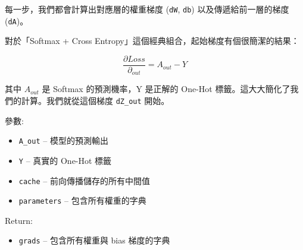 \documentclass[11pt]{article}
\providecommand{\tightlist}{%
      \setlength{\itemsep}{0pt}\setlength{\parskip}{0pt}}
\begin{document}
每一步，我們都會計算出對應層的權重梯度 (\texttt{dW}, \texttt{db})
以及傳遞給前一層的梯度 (\texttt{dA})。

對於「Softmax + Cross Entropy」這個經典組合，起始梯度有個很簡潔的結果：

\[
\frac{∂Loss}{\partial_{out}}=A_{out}-Y
\]

其中 \(A_{out}\) 是 Softmax 的預測機率，Y 是正解的 One-Hot
標籤。這大大簡化了我們的計算。我們就從這個梯度 \texttt{dZ\_out} 開始。

參數:

\begin{itemize}
\tightlist
\item
  \texttt{A\_out} -- 模型的預測輸出
\item
  \texttt{Y} -- 真實的 One-Hot 標籤
\item
  \texttt{cache} -- 前向傳播儲存的所有中間值
\item
  \texttt{parameters} -- 包含所有權重的字典
\end{itemize}

Return:

\begin{itemize}
\tightlist
\item
  \texttt{grads} -- 包含所有權重與 bias 梯度的字典
\end{itemize}
\end{document}
